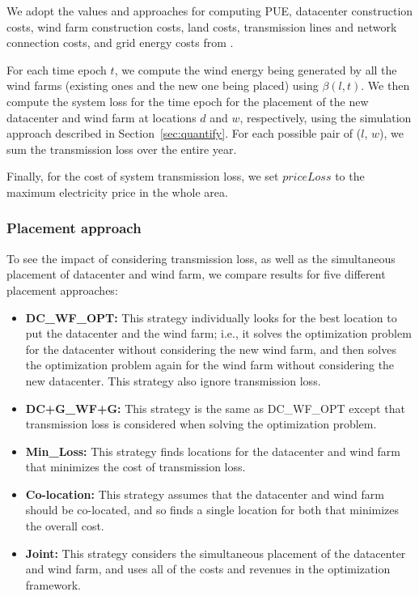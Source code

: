 We adopt the values and approaches for computing PUE, datacenter construction costs, wind farm construction costs, land costs, transmission lines and network connection costs, and grid energy costs from \cite{berral2014building}.  

For each time epoch $t$, we compute the wind energy being generated by all the wind farms (existing ones and the new one being placed) using $\beta(l,t)$.  We then compute the system loss for the time epoch for the placement of the new datacenter and wind farm at locations $d$ and $w$, respectively, using the simulation approach described in Section~\ref{sec:quantify}.  For each possible pair of ($l$, $w$), we sum the transmission loss over the entire year.

Finally, for the cost of system transmission loss, we set $priceLoss$ to the maximum electricity price in the whole area.  

\subsubsection{Placement approach}

To see the impact of considering transmission loss, as well as the simultaneous placement of datacenter and wind farm, we compare results for five different placement approaches:

\begin{itemize}

\item \textbf{DC\_WF\_OPT:} This strategy individually looks for the best location to put the datacenter and the wind farm; i.e., it solves the optimization problem for the datacenter without considering the new wind farm, and then solves the optimization problem again for the wind farm without considering the new datacenter.  This strategy also ignore transmission loss.

\item \textbf{DC+G\_WF+G:} This strategy is the same as DC\_WF\_OPT except that transmission loss is considered when solving the optimization problem.

\item \textbf{Min\_Loss:} This strategy finds locations for the datacenter and wind farm that minimizes the cost of transmission loss.

\item \textbf{Co-location:} This strategy assumes that the datacenter and wind farm 
should be co-located, and so finds a single location for both that minimizes the overall cost.

\item \textbf{Joint:} This strategy considers the simultaneous placement of the datacenter and wind farm, and uses all of the costs and revenues in the optimization framework.

\end{itemize}

